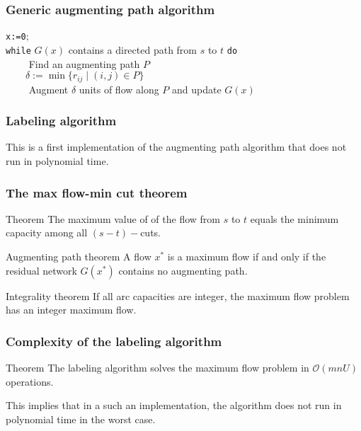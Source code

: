 \documentclass[9pt]{beamer}
\begin{document}
\begin{frame}
\frametitle{Generic augmenting path algorithm}
\texttt{x:=0};\\
\texttt{while} $G(x)$ contains a directed path from $s$ to $t$ \texttt{do}\\
	$\qquad$ Find an augmenting path $P$\\
	$\qquad \delta:= \min\{r_{ij} \mid (i,j)\in P\}$\\
	$\qquad$ Augment $\delta$ units of flow along $P$ and update $G(x)$
\bigskip

\end{frame}
\begin{frame}
\frametitle{Labeling algorithm}
This is a first implementation of the augmenting path algorithm
that \alert{does not run in polynomial time}.\bigskip


\end{frame}
\begin{frame}
\frametitle{The max flow-min cut theorem}
\begin{block}{Theorem}
The maximum value of of the flow from $s$ to $t$ equals the minimum
capacity among all $(s-t)-$cuts.
\end{block}
\begin{block}{Augmenting path theorem}
A flow $x^*$ is a \alert{maximum flow}
if and only if the residual network $G(x^*)$
\alert{contains no augmenting path}.
\end{block}
\begin{block}{Integrality theorem}
If all arc capacities are \alert{integer}, the maximum flow problem
has an \alert{integer} maximum flow.
\end{block}
\end{frame}
\begin{frame}
\frametitle{Complexity of the labeling algorithm}
\begin{block}{Theorem}
The labeling algorithm solves the maximum flow problem
in $\mathcal O(mnU)$ operations.
\end{block}
This implies that in a such an implementation, the algorithm
\alert{does not run } in polynomial time in the \alert{worst case}.
\end{frame}
\end{document}
